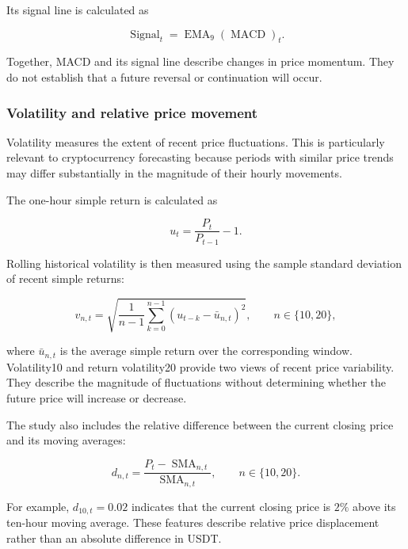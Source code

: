 Its signal line is calculated as

\begin{equation}
\operatorname{Signal}_t
=
\operatorname{EMA}_{9}
\left(\operatorname{MACD}\right)_t.
\label{eq:macd_signal}
\end{equation}

Together, MACD and its signal line describe changes in price momentum. They do not establish that a future reversal or continuation will occur.

\subsubsection{Volatility and relative price movement}

Volatility measures the extent of recent price fluctuations. This is particularly relevant to cryptocurrency forecasting because periods with similar price trends may differ substantially in the magnitude of their hourly movements.

The one-hour simple return is calculated as

\begin{equation}
u_t
=
\frac{P_t}{P_{t-1}}-1.
\label{eq:simple_return}
\end{equation}

Rolling historical volatility is then measured using the sample standard deviation of recent simple returns:

\begin{equation}
v_{n,t}
=
\sqrt{
\frac{1}{n-1}
\sum_{k=0}^{n-1}
\left(u_{t-k}-\bar{u}_{n,t}\right)^2
},
\qquad n\in\{10,20\},
\label{eq:rolling_volatility}
\end{equation}

where $\bar{u}_{n,t}$ is the average simple return over the corresponding window. Volatility10 and return volatility20 provide two views of recent price variability. They describe the magnitude of fluctuations without determining whether the future price will increase or decrease.

The study also includes the relative difference between the current closing price and its moving averages:

\begin{equation}
d_{n,t}
=
\frac{
P_t-\operatorname{SMA}_{n,t}
}{
\operatorname{SMA}_{n,t}
},
\qquad n\in\{10,20\}.
\label{eq:relative_price}
\end{equation}

For example, $d_{10,t}=0.02$ indicates that the current closing price is $2\%$ above its ten-hour moving average. These features describe relative price displacement rather than an absolute difference in USDT.

